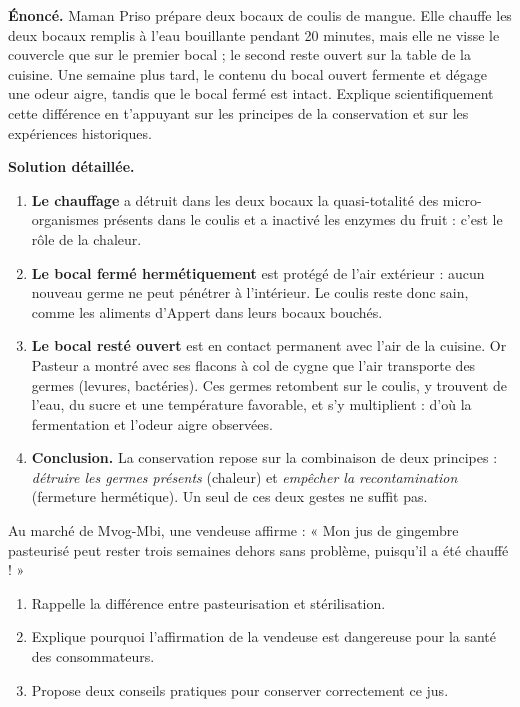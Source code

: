 \documentclass[11pt]{article}
\begin{document}
\begin{exoresolu}
\textbf{Énoncé.} Maman Priso prépare deux bocaux de coulis de mangue. Elle chauffe les deux bocaux remplis à l'eau bouillante pendant 20 minutes, mais elle ne visse le couvercle que sur le premier bocal ; le second reste ouvert sur la table de la cuisine. Une semaine plus tard, le contenu du bocal ouvert fermente et dégage une odeur aigre, tandis que le bocal fermé est intact. Explique scientifiquement cette différence en t'appuyant sur les principes de la conservation et sur les expériences historiques.

\tcblower
\textbf{Solution détaillée.}
\begin{enumerate}
\item \textbf{Le chauffage} a détruit dans les deux bocaux la quasi-totalité des micro-organismes présents dans le coulis et a inactivé les enzymes du fruit : c'est le rôle de la chaleur.
\item \textbf{Le bocal fermé hermétiquement} est protégé de l'air extérieur : aucun nouveau germe ne peut pénétrer à l'intérieur. Le coulis reste donc sain, comme les aliments d'Appert dans leurs bocaux bouchés.
\item \textbf{Le bocal resté ouvert} est en contact permanent avec l'air de la cuisine. Or Pasteur a montré avec ses flacons à col de cygne que l'air transporte des germes (levures, bactéries). Ces germes retombent sur le coulis, y trouvent de l'eau, du sucre et une température favorable, et s'y multiplient : d'où la fermentation et l'odeur aigre observées.
\item \textbf{Conclusion.} La conservation repose sur la combinaison de deux principes : \emph{détruire les germes présents} (chaleur) et \emph{empêcher la recontamination} (fermeture hermétique). Un seul de ces deux gestes ne suffit pas.
\end{enumerate}
\end{exoresolu}

\begin{exercice}
Au marché de Mvog-Mbi, une vendeuse affirme : « Mon jus de gingembre pasteurisé peut rester trois semaines dehors sans problème, puisqu'il a été chauffé ! »
\begin{enumerate}
\item Rappelle la différence entre pasteurisation et stérilisation.
\item Explique pourquoi l'affirmation de la vendeuse est dangereuse pour la santé des consommateurs.
\item Propose deux conseils pratiques pour conserver correctement ce jus.
\end{enumerate}
\end{exercice}
\end{document}
